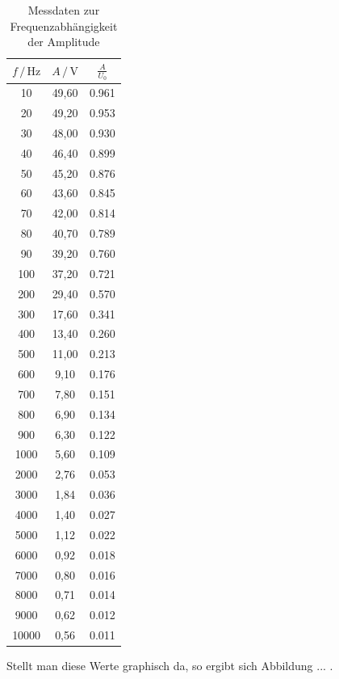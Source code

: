 \begin{table}
\centering
\caption{Messdaten zur Frequenzabhängigkeit der Amplitude}
\label{tab:Messdaten2}
\begin{tabular}{c c c}
\toprule
$f \,/\, \si{\hertz}$ & $A \,/\, \si{\volt}$ & $\frac{A}{U_0}$ \\
\midrule
   10 & 49,60 & 0.961\\
   20 & 49,20 & 0.953\\
   30 & 48,00 & 0.930\\
   40 & 46,40 & 0.899\\
   50 & 45,20 & 0.876\\
   60 & 43,60 & 0.845\\
   70 & 42,00 & 0.814\\
   80 & 40,70 & 0.789\\
   90 & 39,20 & 0.760\\
  100 & 37,20 & 0.721\\
  200 & 29,40 & 0.570\\
  300 & 17,60 & 0.341\\
  400 & 13,40 & 0.260\\
  500 & 11,00 & 0.213\\
  600 &  9,10 & 0.176\\
  700 &  7,80 & 0.151\\
  800 &  6,90 & 0.134\\
  900 &  6,30 & 0.122\\
 1000 &  5,60 & 0.109\\
 2000 &  2,76 & 0.053\\
 3000 &  1,84 & 0.036\\
 4000 &  1,40 & 0.027\\
 5000 &  1,12 & 0.022\\
 6000 &  0,92 & 0.018\\
 7000 &  0,80 & 0.016\\
 8000 &  0,71 & 0.014\\
 9000 &  0,62 & 0.012\\
10000 &  0,56 & 0.011\\
\bottomrule
\end{tabular}
\end{table} 

Stellt man diese Werte graphisch da, so ergibt sich Abbildung ... .

